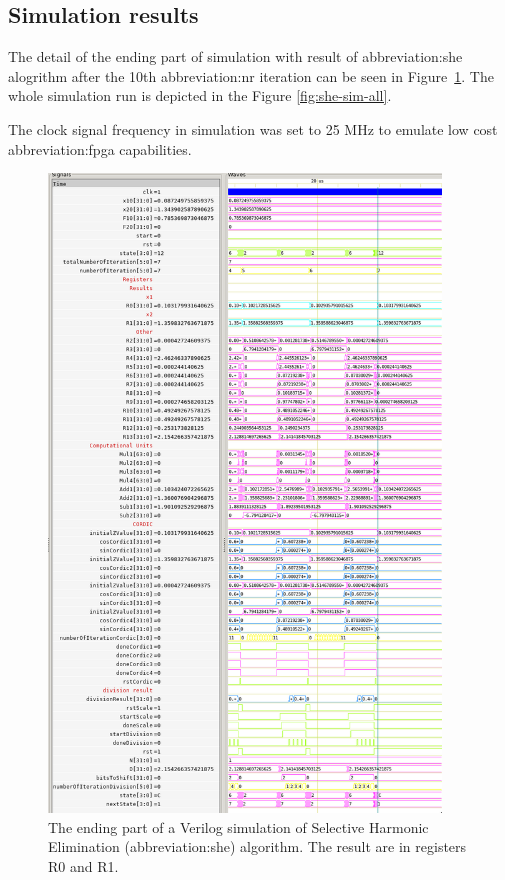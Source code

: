\documentclass[a4paper, twoside, 11pt]{article}
\begin{document}
    \subsection{Simulation results}
        The detail of the ending part of simulation with result of \gls{abbreviation:she} alogrithm after the 10th \gls{abbreviation:nr} iteration can be seen in Figure~\ref{fig:she-sim-end}. The whole simulation run is depicted in the Figure \ref{fig:she-sim-all}.\par
        The clock signal frequency in simulation was set to 25 MHz to emulate low cost \gls{abbreviation:fpga} capabilities.
            \begin{figure}[htbp!]
                \centering
                \includegraphics[width=0.93\textwidth]{src/png/inverted/she-sim-end.png}
                \caption{The ending part of a Verilog simulation of Selective Harmonic Elimination (\gls{abbreviation:she}) algorithm. The result are in registers R0 and R1.}
                \label{fig:she-sim-end}
            \end{figure}
\end{document}
